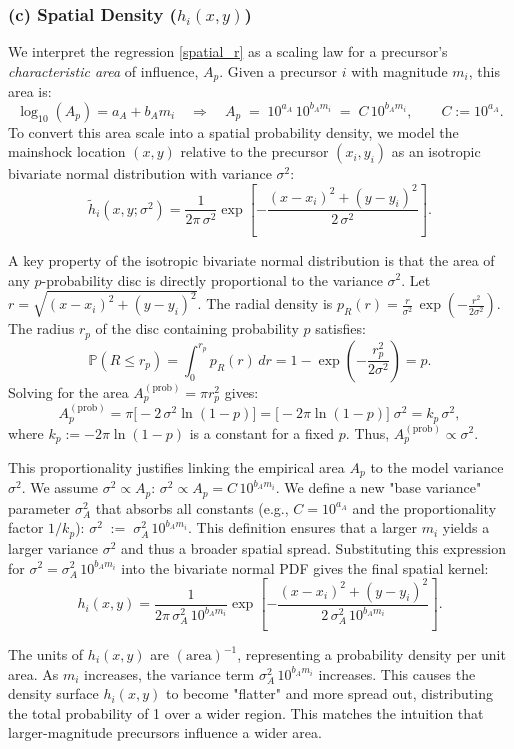 \documentclass[extra,mreferee]{gji}
\theoremstyle{lemma}
\begin{document}
\subsubsection{(c) Spatial Density (\texorpdfstring{$h_i(x,y)$}{hi(x,y)})}

We interpret the regression \eqref{spatial_r} as a scaling law for a precursor’s \emph{characteristic area} of influence, \(A_p\). Given a precursor \(i\) with magnitude \(m_i\), this area is:
\[
\log_{10}(A_p)=a_A+b_A m_i
\quad\Longrightarrow\quad
A_p \;=\; 10^{a_A}\,10^{b_A m_i} \;=\; C\,10^{b_A m_i},\qquad C:=10^{a_A}.
\]
To convert this area scale into a spatial probability density, we model the mainshock location $(x,y)$ relative to the precursor \((x_i,y_i)\) as an isotropic bivariate normal distribution with variance \(\sigma^2\):
\[
\tilde h_i(x,y;\sigma^2)
=
\frac{1}{2\pi\,\sigma^2}
\exp\!\left[-\frac{(x-x_i)^2+(y-y_i)^2}{2\,\sigma^2}\right].
\]

A key property of the isotropic bivariate normal distribution is that the area of any \(p\)-probability disc is directly proportional to the variance \(\sigma^2\).
Let $r=\sqrt{(x-x_i)^2+(y-y_i)^2}$. The radial density is $p_R(r)=\frac{r}{\sigma^2}\,\exp(-\frac{r^2}{2\sigma^2})$.
The radius \(r_p\) of the disc containing probability \(p\) satisfies:
\[
\mathbb{P}(R\le r_p) = \int_0^{r_p} p_R(r)\,dr = 1-\exp\!\left(-\frac{r_p^2}{2\sigma^2}\right)=p.
\]
Solving for the area $A_p^{(\mathrm{prob})}=\pi r_p^2$ gives:
\[
A_p^{(\mathrm{prob})}
= \pi \bigl[-2\,\sigma^2\ln(1-p)\bigr]
= \bigl[-2\pi\ln(1-p)\bigr]\;\sigma^2
= k_p\,\sigma^2,
\]
where $k_p:=-2\pi\ln(1-p)$ is a constant for a fixed \(p\). Thus, $A_p^{(\mathrm{prob})} \propto \sigma^2$.

This proportionality justifies linking the empirical area $A_p$ to the model variance $\sigma^2$. We assume $\sigma^2 \propto A_p$: $\sigma^2 \propto A_p = C\,10^{b_A m_i}.$
We define a new "base variance" parameter $\sigma_A^2$ that absorbs all constants (e.g., $C=10^{a_A}$ and the proportionality factor $1/k_p$):
$ \sigma^2 \;:=\; \sigma_A^2\,10^{b_A m_i}.$
This definition ensures that a larger \(m_i\) yields a larger variance \(\sigma^2\) and thus a broader spatial spread. Substituting this expression for $\sigma^2 = \sigma_A^2\,10^{b_A m_i}$ into the bivariate normal PDF gives the final spatial kernel:
\[
h_i(x,y)
=
\frac{1}{2\pi\,\sigma_A^2\,10^{b_A m_i}}
\exp\!\left[-\frac{(x-x_i)^2+(y-y_i)^2}{2\,\sigma_A^2\,10^{b_A m_i}}\right].
\]

The units of $h_i(x,y)$ are $(\mathrm{area})^{-1}$, representing a probability density per unit area. As $m_i$ increases, the variance term $\sigma_A^2\,10^{b_A m_i}$ increases. This causes the density surface $h_i(x,y)$ to become "flatter" and more spread out, distributing the total probability of 1 over a wider region. This matches the intuition that larger-magnitude precursors influence a wider area.
\end{document}
